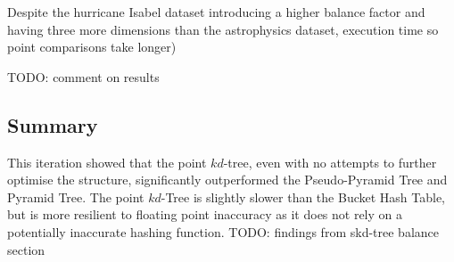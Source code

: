 Despite the hurricane Isabel dataset introducing a higher balance factor and having three more dimensions than the astrophysics dataset, execution time 
so point comparisons take longer)

TODO: comment on results

\subsection{Summary}

This iteration showed that the point $kd$-tree, even with no attempts to further optimise the structure, significantly outperformed the Pseudo-Pyramid Tree and Pyramid Tree. The point $kd$-Tree is slightly slower than the Bucket Hash Table, but is more resilient to floating point inaccuracy as it does not rely on a potentially inaccurate hashing function. TODO: findings from skd-tree balance section